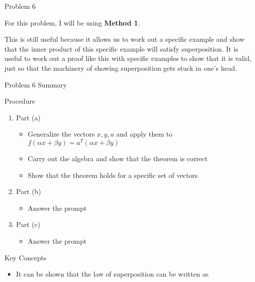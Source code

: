 \begin{problem}{Problem 6}
    \begin{Highlight}
        For this problem, I will be using \textbf{Method 1}. \vspace*{1em} 

        This is still useful because it allows us to work out a specific example and show that the inner product of this specific example will satisfy superposition. It is useful to work out a proof like
        this with specific examples to show that it is valid, just so that the machinery of showing superposition gets stuck in one's head.
    \end{Highlight}
\end{problem}

\begin{summary}{Problem 6 Summary}
    \begin{statement}{Procedure}
        \begin{enumerate}[label = (\alph*)]
            \item Part (a)
            \begin{itemize}
                \item Generalize the vectors $x, y, a$ and apply them to $f(\alpha x + \beta y) = a^{T}(\alpha x + \beta y)$ 
                \item Carry out the algebra and show that the theorem is correct
                \item Show that the theorem holds for a specific set of vectors
            \end{itemize}
            \item Part (b)
            \begin{itemize}
                \item Answer the prompt
            \end{itemize}
            \item Part (c)
            \begin{itemize}
                \item Answer the prompt
            \end{itemize}
        \end{enumerate}
    \end{statement}
    \begin{statement}{Key Concepts}
        \begin{itemize}
            \item It can be shown that the law of superposition can be written as 
            \begin{equation*}

\end{equation*}
\end{itemize}
\end{statement}
\end{summary}
